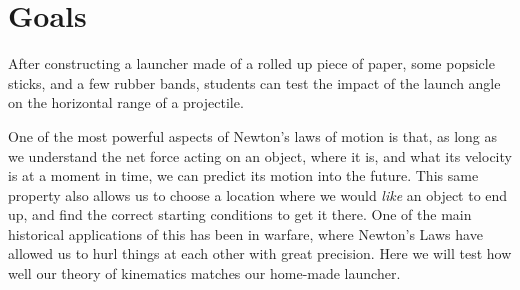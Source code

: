 \renewcommand\thechapter{c1.6}
\label{lab:ProjectileMotion}

\apparatus
{}

\section*{Goals}

After constructing a launcher made of a rolled up piece of paper, some popsicle sticks, and a few rubber bands, students can test the impact of the launch angle on the horizontal range of a projectile.

\introduction

One of the most powerful aspects of Newton's laws of motion is that, as long as we understand the net force acting on an object, where it is, and what its velocity is at a moment in time, we can predict its motion into the future. This same property also allows us to choose a location where we would \emph{like} an object to end up, and find the correct starting conditions to get it there.  One of the main historical applications of this has been in warfare, where Newton's Laws have allowed us to hurl things at each other with great precision.  Here we will test how well our theory of kinematics matches our home-made launcher.

\observations


